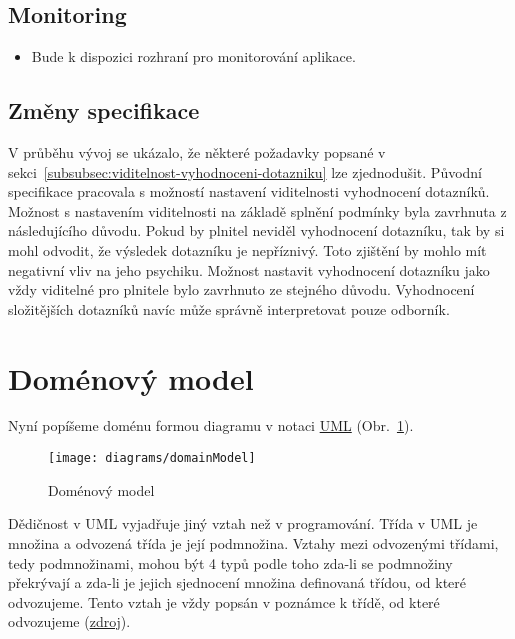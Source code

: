 \subsection{Monitoring}\label{subsec:monitoring}

\begin{itemize}
\item
  Bude k dispozici rozhraní pro monitorování aplikace.
\end{itemize}

\subsection{Změny specifikace}\label{subsec:zmeny-specifikace}

V průběhu vývoj se ukázalo, že některé požadavky popsané v sekci~\ref{subsubsec:viditelnost-vyhodnoceni-dotazniku} lze zjednodušit.
Původní specifikace pracovala s možností nastavení viditelnosti vyhodnocení dotazníků.
Možnost s nastavením viditelnosti na základě splnění podmínky byla zavrhnuta z následujícího důvodu.
Pokud by plnitel neviděl vyhodnocení dotazníku, tak by si mohl odvodit, že výsledek dotazníku je nepříznivý.
Toto zjištění by mohlo mít negativní vliv na jeho psychiku.
Možnost nastavit vyhodnocení dotazníku jako vždy viditelné pro plnitele bylo zavrhnuto ze stejného důvodu.
Vyhodnocení složitějších dotazníků navíc může správně interpretovat pouze odborník.


\section{Doménový model}\label{sec:domenovy-model}

Nyní popíšeme doménu formou diagramu v notaci \href{https://www.omg.org/spec/UML/2.5.1/PDF}{UML} (Obr.~\ref{fig:domain-model}).

\begin{figure}[H]
    \texttt{[image: diagrams/domainModel]}
    \caption{Doménový model}\label{fig:domain-model}
\end{figure}

\begin{tcolorbox}
Dědičnost v UML vyjadřuje jiný vztah než v programování.
Třída v UML je množina a odvozená třída je její podmnožina.
Vztahy mezi odvozenými třídami, tedy podmnožinami, mohou být 4 typů podle toho zda-li se podmnožiny překrývají a zda-li je jejich sjednocení množina definovaná třídou, od které odvozujeme.
Tento vztah je vždy popsán v poznámce k třídě, od které odvozujeme (\href{https://www.omg.org/spec/UML/2.5.1/PDF}{zdroj}).
\end{tcolorbox}

